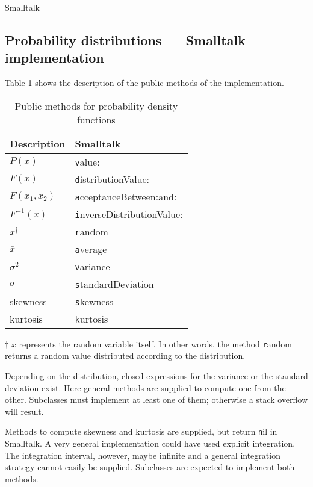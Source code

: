 \begin{displaycode}{Smalltalk}
\subsection{Probability distributions --- Smalltalk implementation}
 Table
\ref{tb:distrgenimpl} shows the description of the public methods
of the implementation.
\begin{table}[h]
  \centering
  \caption{Public methods for probability density functions}
  \label{tb:distrgenimpl}
\vspace{1 ex}
\begin{tabular}{|l | l |} \hline
  Description & \hfil Smalltalk \\ \hline
  $P\left(x\right)$ & {\texttt value:} \\
  $F\left(x\right)$ & {\texttt distributionValue:} \\
  $F\left(x_1,x_2\right)$ & {\texttt acceptanceBetween:and:} \\
  $F^{-1}\left(x\right)$ & {\texttt inverseDistributionValue:} \\
  $x^{\dag}$ & {\texttt random} \\
  \hline
  $\bar{x}$ & {\texttt average} \\
  $\sigma^2$ & {\texttt variance} \\
  $\sigma$ & {\texttt standardDeviation} \\
  skewness & {\texttt skewness} \\
  kurtosis & {\texttt kurtosis} \\
  \hline
\end{tabular}
$\dag$ $x$ represents the random variable itself. In other words,
the method {\texttt random} returns a random value distributed
according to the distribution.
\end{table}

Depending on the distribution, closed expressions for the variance
or the standard deviation exist. Here general methods are supplied
to compute one from the other. Subclasses must implement at least
one of them; otherwise a stack overflow will result.

Methods to compute skewness and kurtosis are supplied, but return
{\texttt nil} in Smalltalk. A very general
implementation could have used explicit integration. The
integration interval, however, maybe infinite and a general
integration strategy cannot easily be supplied. Subclasses are
expected to implement both methods.


\end{displaycode}
